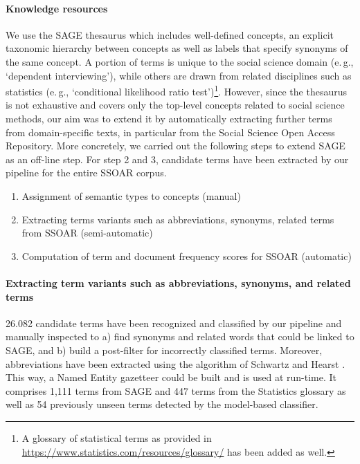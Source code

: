 \paragraph{Knowledge resources}%
We use the SAGE thesaurus which includes well-defined concepts, an explicit taxonomic hierarchy between concepts as well as labels that specify synonyms of the same concept.
A portion of terms is unique to the social science domain (e.\,g.,  `dependent interviewing'), while others are drawn from related disciplines such as statistics (e.\,g., `conditional likelihood ratio test')\footnote{A glossary of statistical terms as provided in \url{https://www.statistics.com/resources/glossary/} has been added as well.}.
However, since the thesaurus is not exhaustive and covers only the top-level concepts related to social science methods, our aim was to extend it by automatically extracting further terms from domain-specific texts, in particular from the Social Science Open Access Repository.
More concretely, we carried out the following steps to extend SAGE as an off-line step. For step 2 and 3, candidate terms have been extracted by our pipeline for the entire SSOAR corpus. 
\begin{enumerate}
\item Assignment of semantic types to concepts (manual) 
\item Extracting terms variants such as abbreviations, synonyms, related terms from SSOAR (semi-automatic)
\item Computation of term and document frequency scores for SSOAR (automatic)
\end{enumerate}

\paragraph{Extracting term variants such as abbreviations, synonyms, and related terms}%
26.082 candidate terms have been recognized and classified by our pipeline and manually inspected to  
a) find synonyms and related words that could be linked to SAGE, and
b) build a post-filter for incorrectly classified terms. 
Moreover, abbreviations have been extracted using the algorithm of Schwartz and Hearst
\cite{SchwartzH03}.
This way, a Named Entity gazetteer could be built and is used at run-time. It comprises 1,111 terms from SAGE and 447 terms from the Statistics glossary as well as 54 previously unseen terms detected by the model-based classifier. 




